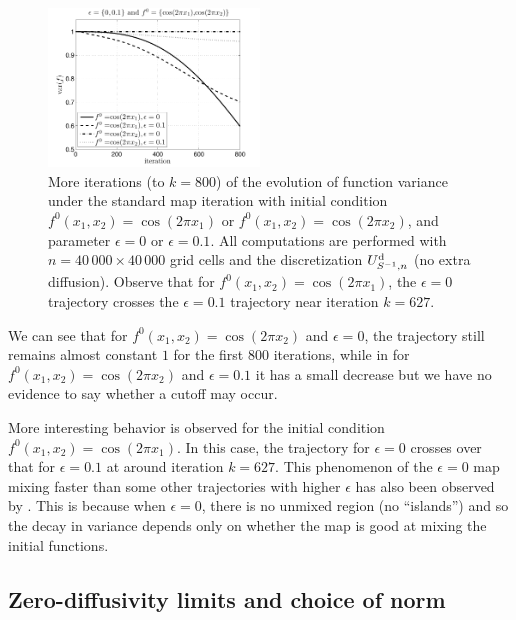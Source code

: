 \documentclass{aims}
\theoremstyle{definition}
\begin{document}
\begin{figure}
  \centerline{
    \includegraphics[width=0.5\textwidth,trim=0 0 0 22,clip=true]{standardmapparamsmall}
  }
  \caption{\label{standardmapparamsmall} More iterations (to $k =
    800$) of the evolution of function variance under the standard map
    iteration with initial condition $f^0(x_1,x_2) = \cos(2\pi x_1)$
    or $f^0(x_1,x_2) = \cos(2\pi x_2)$, and parameter $\epsilon = 0$
    or $\epsilon = 0.1$. All computations are performed with
    $n=40\,000 \times 40\,000$ grid cells and the discretization
    $U_{S^{-1},n}^{\rm d}$ (no extra diffusion). Observe that for
    $f^0(x_1,x_2)=\cos(2\pi x_1)$, the $\epsilon=0$ trajectory crosses
    the $\epsilon=0.1$ trajectory near iteration $k = 627$.}
\end{figure}

We can see that for $f^0(x_1,x_2)= \cos(2 \pi x_2)$ and $\epsilon=0$,
the trajectory still remains almost constant $1$ for the first $800$
iterations, while in for $f^0(x_1,x_2)= \cos(2 \pi x_2)$ and
$\epsilon=0.1$ it has a small decrease but we have no evidence to say
whether a cutoff may occur.

More interesting behavior is observed for the initial condition
$f^0(x_1,x_2)= \cos(2 \pi x_1)$. In this case, the trajectory for
$\epsilon=0$ crosses over that for $\epsilon=0.1$ at around iteration
$k = 627$. This phenomenon of the $\epsilon=0$ map mixing faster than
some other trajectories with higher $\epsilon$ has also been observed
by \cite{Mezic2005}. This is because when $\epsilon=0$, there is no
unmixed region (no ``islands'') and so the decay in variance depends
only on whether the map is good at mixing the initial functions.

\subsection{Zero-diffusivity limits and choice of norm}
\label{sec:zero-diff-limits}
\end{document}
